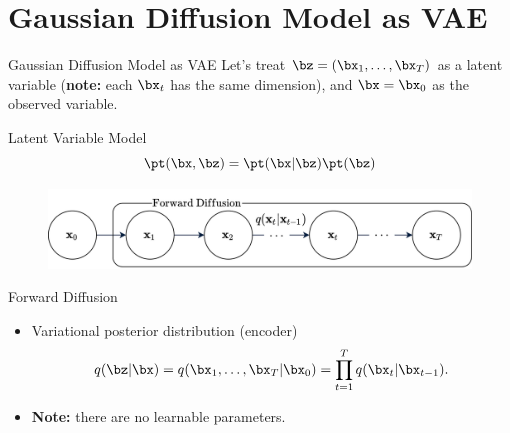 \documentclass{beamer}
\begin{document}
\section{Gaussian Diffusion Model as VAE}
\begin{frame}{Gaussian Diffusion Model as VAE}
    Let's treat $\bz = (\bx_1, \dots, \bx_T)$ as a latent variable (\textbf{note:} each $\bx_t$ has the same dimension), and $\bx = \bx_0$ as the observed variable.
    \begin{block}{Latent Variable Model}
        \vspace{-0.3cm}
        \[
            \pt(\bx, \bz) = \pt(\bx | \bz) \pt(\bz)
        \]    
        \vspace{-0.7cm}
    \end{block}
    \eqpause
    \begin{figure}
        \includegraphics[width=0.8\linewidth]{figs/diffusion_pgm_forward}
    \end{figure}
    \eqpause
    \vspace{-0.3cm}
    \begin{block}{Forward Diffusion}
        \begin{itemize}
            \item Variational posterior distribution (encoder)
            \vspace{-0.3cm}
            \[
                q(\bz | \bx) = q(\bx_1, \dots, \bx_T | \bx_0) = \prod_{t = 1}^T q(\bx_t | \bx_{t - 1}).
            \]
            \item \textbf{Note:} there are no learnable parameters.
        \end{itemize}
        \vspace{-0.5cm}
    \end{block}
\end{frame}
\end{document}
